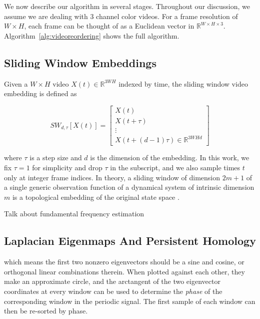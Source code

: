 \documentclass{article}
\begin{document}
We now describe our algorithm in several stages.  Throughout our discussion, we assume we are dealing with 3 channel color videos.  For a frame resolution of $W \times H$, each frame can be thought of as a Euclidean vector in $\mathbb{R}^{W \times H \times 3}$.  Algorithm~\ref{alg:videoreordering} shows the full algorithm.

\subsection{Sliding Window Embeddings}
\label{sec:slidingwindow}

Given a $W \times H$ video $X(t) \in \mathbb{R}^{3WH}$ indexed by time, the sliding window video embedding \cite{cao1998dynamics,traliehigh,tralie2017quasi} is defined as

\begin{equation}
SW_{d, \tau}[X(t)] = \left[ \begin{array}{c} X(t) \\ X(t + \tau) \\ \vdots \\ X(t + (d-1)\tau)  \in \mathbb{R}^{3WHd} \end{array} \right]
\end{equation}

where $\tau$ is a step size and $d$ is the dimension of the embedding.  In this work, we fix $\tau = 1$ for simplicity and drop $\tau$ in the subscript, and we also sample times $t$ only at integer frame indices.  In theory, a sliding window of dimension $2m+1$ of a single generic observation function of a dynamical system of intrinsic dimension $m$ is a topological embedding of the original state space \cite{takens1981detecting}.

Talk about fundamental frequency estimation \cite{Mcleod05asmarter}



\subsection{Laplacian Eigenmaps And Persistent Homology}
\label{sec:laplacian}

which means the first two nonzero eigenvectors should be a sine and cosine, or orthogonal linear combinations therein.  When plotted against each other, they make an approximate circle, and the arctangent of the two eigenvector coordinates at every window can be used to determine the {\em phase} of the corresponding window in the periodic signal.  The first sample of each window can then be re-sorted by phase.
\end{document}
